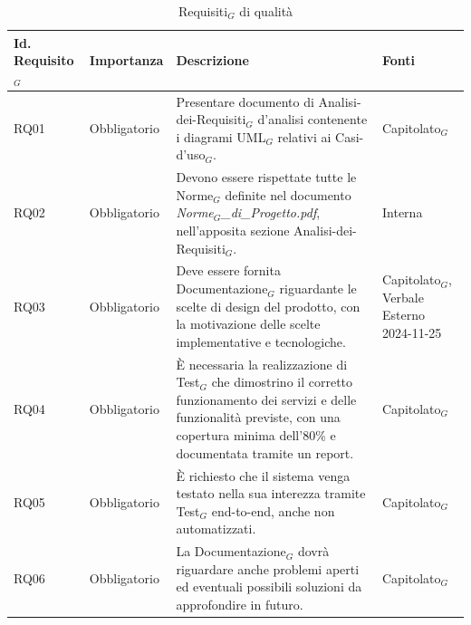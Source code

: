 \documentclass[11pt]{article}
\begin{document}
\begin{justify}
\begin{table}[H]
\centering
\renewcommand{\arraystretch}{1.5}
\begin{tabular}{|>{\centering\arraybackslash}m{2.7cm}|>{\centering\arraybackslash}m{2.7cm}|>{\centering\arraybackslash}m{6cm}|>{\centering\arraybackslash}m{2.1cm}|}
\hline
\textbf{Id. Requisito$_G$} & \textbf{Importanza} & \textbf{Descrizione} & \textbf{Fonti}\\
\hline
RQ01 & Obbligatorio & Presentare documento di Analisi-dei-Requisiti$_G$ d'analisi contenente i diagrami UML$_G$ relativi ai Casi-d'uso$_G$. & Capitolato$_G$\\
\hline
RQ02 & Obbligatorio & Devono essere rispettate tutte le Norme$_G$ definite nel documento \textit{Norme$_G$\_di\_Progetto.pdf}, nell'apposita sezione Analisi-dei-Requisiti$_G$. & Interna\\
\hline
RQ03 & Obbligatorio & Deve essere fornita Documentazione$_G$ riguardante le scelte di design del prodotto, con la motivazione delle scelte implementative e tecnologiche. & Capitolato$_G$, Verbale Esterno 2024-11-25\\
\hline
RQ04 & Obbligatorio & È necessaria la realizzazione di Test$_G$ che dimostrino il corretto funzionamento dei servizi e delle funzionalità previste, con una copertura minima dell'80\% e documentata tramite un report.  & Capitolato$_G$\\
\hline
RQ05 & Obbligatorio & È richiesto che il sistema venga testato nella sua interezza tramite Test$_G$ end-to-end, anche non automatizzati.  & Capitolato$_G$\\
\hline
RQ06 & Obbligatorio & La Documentazione$_G$ dovrà riguardare anche problemi aperti ed eventuali possibili soluzioni da approfondire in futuro.  & Capitolato$_G$\\
\hline
\end{tabular}
\caption{Requisiti$_G$ di qualità}
\end{table}

\newpage

\end{justify}
\end{document}
